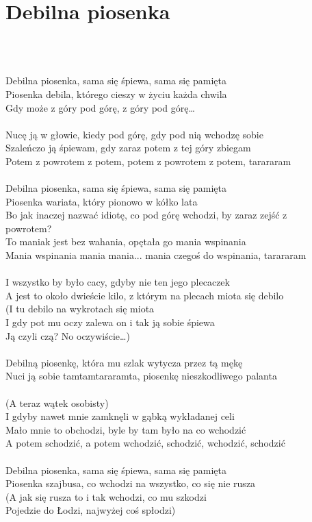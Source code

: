 \documentclass[a5paper, 10pt]{book}
\begin{document}
\newpage
\section{Debilna piosenka}\textcolor{lightgray}{\textit{}}\\~\\
\begin{minipage}[t]{0.85\textwidth}
Debilna piosenka, sama się śpiewa, sama się pamięta\\
Piosenka debila, którego cieszy w życiu każda chwila\\
Gdy może z góry pod górę, z góry pod górę…\\
\\
Nucę ją w głowie, kiedy pod górę, gdy pod nią wchodzę sobie\\
Szaleńczo ją śpiewam, gdy zaraz potem z tej góry zbiegam\\
Potem z powrotem z potem, potem z powrotem z potem, tarararam\\
\\
Debilna piosenka, sama się śpiewa, sama się pamięta\\
Piosenka wariata, który pionowo w kółko lata\\
Bo jak inaczej nazwać idiotę, co pod górę wchodzi, by zaraz zejść z\\
powrotem?\\
To maniak jest bez wahania, opętała go mania wspinania\\
Mania wspinania mania mania... mania czegoś do wspinania, tarararam\\
\\
I wszystko by było cacy, gdyby nie ten jego plecaczek\\
A jest to około dwieście kilo, z którym na plecach miota się debilo\\
(I tu debilo na wykrotach się miota\\
I gdy pot mu oczy zalewa on i tak ją sobie śpiewa\\
Ją czyli czą? No oczywiście…)\\
\\
Debilną piosenkę, która mu szlak wytycza przez tą mękę\\
Nuci ją sobie tamtamtararamta, piosenkę nieszkodliwego palanta\\
\\
(A teraz wątek osobisty)\\
I gdyby nawet mnie zamknęli w gąbką wykładanej celi\\
Mało mnie to obchodzi, byle by tam było na co wchodzić\\
A potem schodzić, a potem wchodzić, schodzić, wchodzić, schodzić\\
\\
Debilna piosenka, sama się śpiewa, sama się pamięta\\
Piosenka szajbusa, co wchodzi na wszystko, co się nie rusza\\
(A jak się rusza to i tak wchodzi, co mu szkodzi\\
Pojedzie do Łodzi, najwyżej coś spłodzi)\\


\end{minipage}
\end{document}
